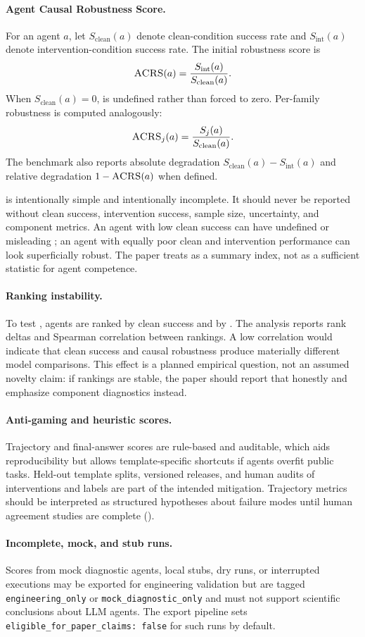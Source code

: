\paragraph{Agent Causal Robustness Score.}
For an agent $a$, let $S_{\mathrm{clean}}(a)$ denote clean-condition success rate and $S_{\mathrm{int}}(a)$ denote intervention-condition success rate. The initial robustness score is
\[
\textsc{ACRS}(a) = \frac{S_{\mathrm{int}}(a)}{S_{\mathrm{clean}}(a)}.
\]
When $S_{\mathrm{clean}}(a)=0$, \acrs is undefined rather than forced to zero. Per-family robustness is computed analogously:
\[
\textsc{ACRS}_j(a) = \frac{S_j(a)}{S_{\mathrm{clean}}(a)}.
\]
The benchmark also reports absolute degradation $S_{\mathrm{clean}}(a)-S_{\mathrm{int}}(a)$ and relative degradation $1-\textsc{ACRS}(a)$ when defined.

\acrs is intentionally simple and intentionally incomplete. It should never be reported without clean success, intervention success, sample size, uncertainty, and component metrics. An agent with low clean success can have undefined or misleading \acrs; an agent with equally poor clean and intervention performance can look superficially robust. The paper treats \acrs as a summary index, not as a sufficient statistic for agent competence.

\paragraph{Ranking instability.}
To test , agents are ranked by clean success and by \acrs. The analysis reports rank deltas and Spearman correlation between rankings. A low correlation would indicate that clean success and causal robustness produce materially different model comparisons. This effect is a planned empirical question, not an assumed novelty claim: if rankings are stable, the paper should report that honestly and emphasize component diagnostics instead.

\paragraph{Anti-gaming and heuristic scores.}
Trajectory and final-answer scores are rule-based and auditable, which aids reproducibility but allows template-specific shortcuts if agents overfit public tasks. Held-out template splits, versioned releases, and human audits of interventions and labels are part of the intended mitigation. Trajectory metrics should be interpreted as structured hypotheses about failure modes until human agreement studies are complete ().

\paragraph{Incomplete, mock, and stub runs.}
Scores from mock diagnostic agents, local stubs, dry runs, or interrupted executions may be exported for engineering validation but are tagged \texttt{engineering\_only} or \texttt{mock\_diagnostic\_only} and must not support scientific conclusions about LLM agents. The export pipeline sets \texttt{eligible\_for\_paper\_claims: false} for such runs by default.
